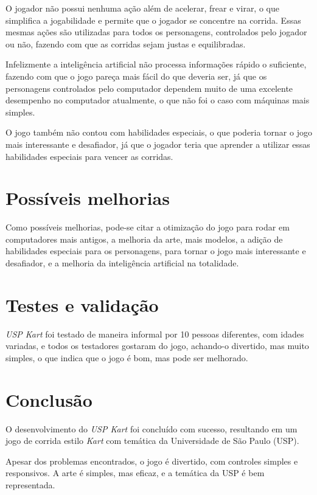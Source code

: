 O jogador não possui nenhuma ação além de acelerar, frear e virar, o que simplifica a jogabilidade e permite que o jogador se concentre na corrida. Essas mesmas ações são utilizadas para todos os personagens, controlados pelo jogador ou não, fazendo com que as corridas sejam justas e equilibradas.

Infelizmente a inteligência artificial não processa informações rápido o suficiente, fazendo com que o jogo pareça mais fácil do que deveria ser, já que os personagens controlados pelo computador dependem muito de uma excelente desempenho no computador atualmente, o que não foi o caso com máquinas mais simples.

O jogo também não contou com habilidades especiais, o que poderia tornar o jogo mais interessante e desafiador, já que o jogador teria que aprender a utilizar essas habilidades especiais para vencer as corridas.

\section{Possíveis melhorias}

Como possíveis melhorias, pode-se citar a otimização do jogo para rodar em computadores mais antigos, a melhoria da arte, mais modelos, a adição de habilidades especiais para os personagens, para tornar o jogo mais interessante e desafiador, e a melhoria da inteligência artificial na totalidade.

\section{Testes e validação}

\textit{USP Kart} foi testado de maneira informal por 10 pessoas diferentes, com idades variadas, e todos os testadores gostaram do jogo, achando-o divertido, mas muito simples, o que indica que o jogo é bom, mas pode ser melhorado.

\section{Conclusão}

O desenvolvimento do \textit{USP Kart} foi concluído com sucesso, resultando em um jogo de corrida estilo \textit{Kart} com temática da Universidade de São Paulo (USP).

Apesar dos problemas encontrados, o jogo é divertido, com controles simples e responsivos. A arte é simples, mas eficaz, e a temática da USP é bem representada.

